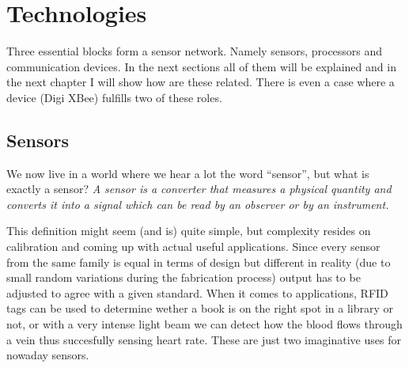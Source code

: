 
\chapter{Technologies} %

\label{Chapter3} %




Three essential blocks form a sensor network. Namely sensors, processors and communication devices\citep{chong2003sensor}. In the next sections all of them will be explained and in the next chapter I will show how are these related. There is even a case where a device (Digi XBee\textregistered) fulfills two of these roles.



\section{Sensors}

We now live in a world where we hear a lot the word ``sensor'', but what is exactly a sensor? \emph{A sensor is a converter that measures a physical quantity and converts it into a signal which can be read by an observer or by an instrument.}\citep{WikiSensor}

This definition might seem (and is) quite simple, but complexity resides on calibration and coming up with actual useful applications. Since every sensor from the same family is equal in terms of design but different in reality (due to small random variations during the fabrication process) output has to be adjusted to agree with a given standard. When it comes to applications, RFID tags can be used to determine wether a book is on the right spot in a library or not, or with a very intense light beam we can detect how the blood flows through a vein thus succesfully sensing heart rate. These are just two imaginative uses for nowaday sensors.

